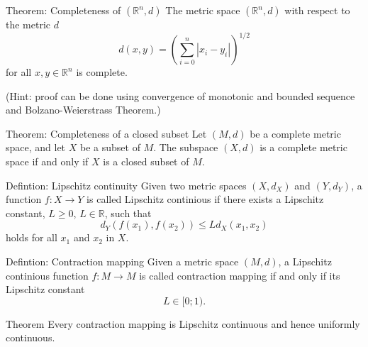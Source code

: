 \documentclass[10pt]{beamer}
\begin{document}
\begin{frame}
  \begin{block}{Theorem: Completeness of \((\mathbb{R}^n, d)\)}
    The metric space \((\mathbb{R}^n, d)\) with respect to the metric \(d\)
    \[d(x, y) = \left( \sum^n_{i=0} |x_i - y_i| \right)^{1/2}\]
    for all \(x, y \in \mathbb{R}^n\) is complete.
  \end{block}
  (Hint: proof can be done using convergence of monotonic and bounded sequence and
  Bolzano-Weierstrass Theorem.)
\end{frame}

\begin{frame}
  \begin{block}{Theorem: Completeness of a closed subset}
    Let \((M, d)\) be a complete metric space, and let \(X\) be a subset of \(M\). The subspace \((X, d)\) is a complete metric space if and only if \(X\) is a closed subset of \(M\).
  \end{block}
\end{frame}

\begin{frame}
  \begin{block}{Defintion: Lipschitz continuity}
    Given two metric spaces \((X, d_X)\) and \((Y, d_Y)\), a function \(f: X \rightarrow Y\) is called
    Lipschitz continious if there exists a Lipschitz constant, \(L \ge 0\), \(L \in \mathbb{R}\), such that
    \[d_Y(f(x_1), f(x_2)) \le Ld_X(x_1, x_2)\]
    holds for all \(x_1\) and \(x_2\) in \(X\).
  \end{block}

  \begin{block}{Defintion: Contraction mapping}
    Given a metric space \((M, d)\), a Lipschitz continious function \(f: M \rightarrow M\) is called
    contraction mapping if and only if its Lipschitz constant
    \[L \in [0;1).\]
  \end{block}
\end{frame}

\begin{frame}
  \begin{block}{Theorem}
    Every contraction mapping is Lipschitz continuous and hence uniformly continuous.
  \end{block}
\end{frame}
\end{document}
